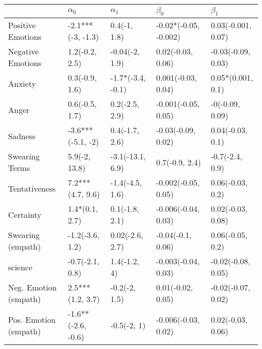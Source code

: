 \begin{tabular}{lllll}
\toprule
{} &          $\alpha_0$ &         $\alpha_1$ &              $\beta_0$ &           $\beta_1$ \\
\midrule
Positive Emotions     &   -2.1***(-3, -1.3) &       0.4(-1, 1.8) &  -0.02*(-0.05, -0.002) &  0.03(-0.001, 0.07) \\
Negative Emotions     &      1.2(-0.2, 2.5) &     -0.04(-2, 1.9) &      0.02(-0.03, 0.06) &  -0.03(-0.09, 0.03) \\
Anxiety               &      0.3(-0.9, 1.6) &  -1.7*(-3.4, -0.1) &     0.001(-0.03, 0.04) &   0.05*(0.001, 0.1) \\
Anger                 &      0.6(-0.5, 1.7) &     0.2(-2.5, 2.9) &    -0.001(-0.05, 0.05) &     -0(-0.09, 0.09) \\
Sadness               &   -3.6***(-5.1, -2) &     0.4(-1.7, 2.6) &     -0.03(-0.09, 0.02) &    0.04(-0.03, 0.1) \\
Swearing Terms        &       5.9(-2, 13.8) &   -3.1(-13.1, 6.9) &         0.7(-0.9, 2.4) &     -0.7(-2.4, 0.9) \\
Tentativeness         &    7.2***(4.7, 9.6) &    -1.4(-4.5, 1.6) &    -0.002(-0.05, 0.05) &    0.06(-0.03, 0.2) \\
Certainty             &      1.4*(0.1, 2.7) &     0.1(-1.8, 2.1) &    -0.006(-0.04, 0.03) &   0.02(-0.03, 0.08) \\
Swearing (empath)     &     -1.2(-3.6, 1.2) &    0.02(-2.6, 2.7) &      -0.04(-0.1, 0.06) &    0.06(-0.05, 0.2) \\
science               &     -0.7(-2.1, 0.8) &       1.4(-1.2, 4) &    -0.003(-0.04, 0.03) &  -0.02(-0.08, 0.05) \\
Neg. Emotion (empath) &    2.5***(1.2, 3.7) &      -0.2(-2, 1.5) &      0.01(-0.02, 0.05) &  -0.02(-0.07, 0.02) \\
Pos. Emotion (empath) &  -1.6**(-2.6, -0.6) &        -0.5(-2, 1) &    -0.006(-0.03, 0.02) &   0.02(-0.03, 0.06) \\
\bottomrule
\end{tabular}

